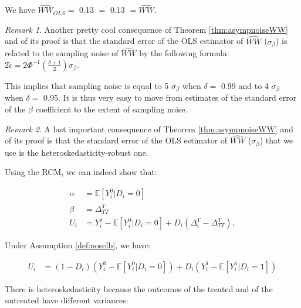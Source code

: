 \documentclass[
]{book}
\newenvironment{Shaded}{\begin{snugshade}}{\end{snugshade}}
\newcommand{\DecValTok}[1]{\textcolor[rgb]{0.00,0.00,0.81}{#1}}
\newcommand{\FunctionTok}[1]{\textcolor[rgb]{0.00,0.00,0.00}{#1}}
\newcommand{\NormalTok}[1]{#1}
\newcommand{\OtherTok}[1]{\textcolor[rgb]{0.56,0.35,0.01}{#1}}
\newcommand{\SpecialCharTok}[1]{\textcolor[rgb]{0.00,0.00,0.00}{#1}}
\newcommand{\esp}[1]{\mathbb{E}[ #1 ]}
\theoremstyle{definition}
\theoremstyle{definition}
\theoremstyle{definition}
\theoremstyle{definition}
\theoremstyle{remark}
\newtheorem*{remark}{Remark}
\begin{document}
\begin{Shaded}
\end{Shaded}

We have \(\hat{WW}_{OLS}=\) 0.13 \(=\) 0.13 \(=\hat{WW}\).

\begin{remark}
\iffalse{} {Remark. } \fi{}Another pretty cool consequence of Theorem \ref{thm:asympnoiseWW} and of its proof is that the standard error of the OLS estimator of \(\hat{WW}\) (\(\sigma_{\beta}\)) is related to the sampling noise of \(\hat{WW}\) by the following formula:
\(2\tilde{\epsilon}=2\Phi^{-1}\left(\frac{\delta+1}{2}\right)\sigma_{\beta}\).
\end{remark}
This implies that sampling noise is equal to 5 \(\sigma_{\beta}\) when \(\delta=\) 0.99 and to 4 \(\sigma_{\beta}\) when \(\delta=\) 0.95.
It is thus very easy to move from estimates of the standard error of the \(\beta\) coefficient to the extent of sampling noise.

\begin{remark}
\iffalse{} {Remark. } \fi{}A last important consequence of Theorem \ref{thm:asympnoiseWW} and of its proof is that the standard error of the OLS estimator of \(\hat{WW}\) (\(\sigma_{\beta}\)) that we use is the heteroskedasticity-robust one.
\end{remark}
Using the RCM, we can indeed show that:

\begin{align*}
    \alpha & = \esp{Y_i^0|D_i=0}  \\
    \beta  & =  \Delta^Y_{TT} \\
    U_i    & = Y^0_i-\esp{Y^0_i|D_i=0} + D_i(\Delta^Y_i-\Delta^Y_{TT}),
    \end{align*}

Under Assumption \ref{def:noselb}, we have:

\begin{align*}
    U_i    & = (1-D_i)(Y^0_i-\esp{Y^0_i|D_i=0}) + D_i(Y_i^1-\esp{Y^1_i|D_i=1})
  \end{align*}

There is heteroskedasticity because the outcomes of the treated and of the untreated have different variances:
\end{document}
